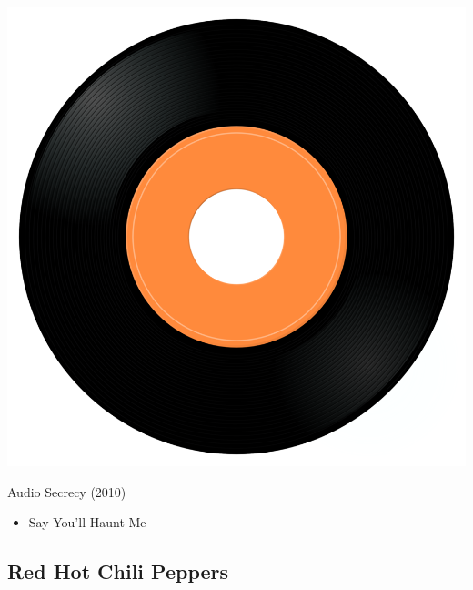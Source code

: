 \begin{minipage}[t]{0.25\textwidth}
\captionsetup{type=figure}
\includegraphics[width=\textwidth]{Images/cover.png}
\caption*{Audio Secrecy (2010)}
\end{minipage}
\begin{minipage}[t]{0.25\textwidth}\vspace{0pt}
\begin{itemize}[nosep,leftmargin=1em,labelwidth=*,align=left]
	\setlength{\itemsep}{0pt}
	\item Say You'll Haunt Me
\end{itemize}
\end{minipage}

\subsection{Red Hot Chili Peppers}

